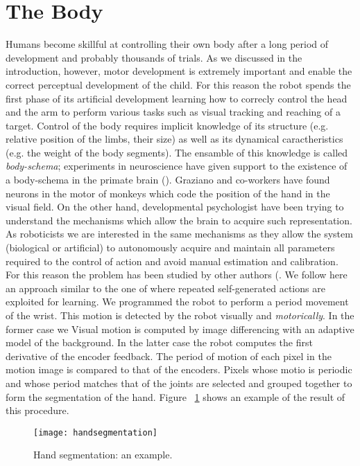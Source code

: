 \section{The Body}
Humans become skillful at controlling their own body after a long period of development and probably thousands of trials. As we discussed in the introduction, however, motor development is extremely important and enable the correct perceptual development of the child. For this reason the robot spends the first phase of its artificial development learning how to correcly control the head and the arm to perform various tasks such as visual tracking and reaching of a target.
Control of the body requires implicit knowledge of its structure (e.g. relative position of the limbs, their size) as well as its dynamical caractheristics (e.g. the weight of the body segments). The ensamble of this knowledge is called \emph{body-schema}; experiments in neuroscience have given support to the existence of a body-schema in the primate brain (\cite{graziano99whereis,graziano00coding}). Graziano and co-workers have found neurons in the motor of monkeys which code the position of the hand in the visual field.
On the other hand, developmental psychologist have been trying to understand the mechanisms which allow the brain to acquire such representation. As roboticists we are interested in the same mechanisms as they allow the system (biological or artificial) to autonomously acquire and maintain all parameters required to the control of action and avoid manual estimation and calibration. For this reason the problem has been studied by other authors (\cite{yoshikawa03doestheinvariance,fitzpatrick04feelthebeat,metta03early}.
We follow here an approach similar to the one of \cite{fitzpatrick04feelthebeat,metta03early} where repeated self-generated actions are exploited for learning. We programmed the robot to perform a period movement of the wrist. This motion is detected by the robot visually and \emph{motorically}. In the former case we Visual motion is computed by image differencing with an adaptive model of the background. In the latter case the robot computes the first derivative of the encoder feedback. The period of motion of each pixel in the motion image is compared to that of the encoders. Pixels whose motio is periodic and whose period matches that of the joints are selected and grouped together to form the segmentation of the hand. Figure ~\ref{handsegmentation} shows an example of the result of this procedure.

\begin{figure}
\centering
\texttt{[image: handsegmentation]}
\caption{Hand segmentation: an example.}
\label{handsegmentation}
\end{figure}

